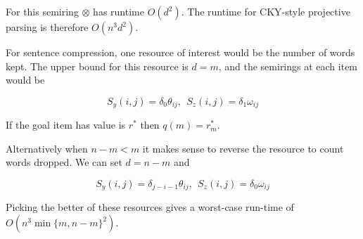 \documentclass[11pt]{article}
\DeclareMathOperator*{\argmax}{arg\,max}
\newcommand{\rtrap}{\scalebox{0.2}{\tikz{
    \coordinate (A) at (0,0);
    \coordinate (B) at (90:1.5cm);
    \coordinate (C) at (2.5,0.9cm);
    \coordinate (D) at (0:2.5cm);
    \draw[line width = 0.05cm] (A)--(B)--(C)--(D)--cycle;
    }}}
\newcommand{\rtri}{\scalebox{0.2}{\tikz{
    \coordinate (A) at (0,0);
    \coordinate (B) at (90:1.5cm);
    \coordinate (C) at (180:-1.7cm);
    \draw[line width = 0.05cm] (A)--(B)--(C)--cycle;
    }}}
\begin{document}
For this semiring $\otimes$ has runtime $O(d^2)$. The runtime for CKY-style
projective parsing is therefore $O(n^3d^2)$.


For sentence compression, one resource of interest would be the number of 
words kept. The upper bound for this resource is $d=m$, and the semirings 
at each item would be

\[ S_y(i,j) = \delta_0  \theta_{ij} , \ \  S_z(i,j) = \delta_1 \omega_{ij}  \]

If the goal item has value is $r^*$ then $q(m) = r^*_m$.

Alternatively when $n - m < m$ it makes sense to reverse the resource to 
count words dropped. We can set $d = n - m$ and 

\[S_y(i,j) = \delta_{j-i-1}  \theta_{ij} ,\ \   S_z(i,j) = \delta_0 \omega_{ij}    \]

Picking the better of these resources gives a worst-case run-time of $O(n^3\min\{m,n-m\}^2)$. 










\end{document}
